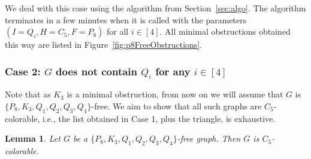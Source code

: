 \documentclass[11pt,a4paper]{article}
\theoremstyle{mystyle}
\newtheorem{lemma}[theorem]{Lemma}
\begin{document}
We deal with this case using the algorithm from Section~\ref{sec:algo}.
The algorithm terminates in a few minutes when it is called with the parameters $(I=Q_i,H=C_5,F=P_8)$ for all $i \in [4]$.
All minimal obstructions obtained this way are listed in Figure~\ref{fig:p8FreeObstructions}.

\subsubsection*{Case 2: $G$ does not contain $Q_i$ for any $i \in [4]$}

Note that as  $K_3$ is a minimal obstruction, from now on we will assume that $G$ is $\{P_8,K_3,Q_1,Q_2,Q_3,Q_4\}$-free.
We aim to show that all such graphs are $C_5$-colorable, i.e., the list obtained in Case 1, plus the triangle, is exhaustive.


\begin{lemma}
Let $G$ be a $\{P_8,K_3,Q_1,Q_2,Q_3,Q_4\}$-free graph. Then $G$ is $C_5$-colorable.
\end{lemma}
\end{document}
